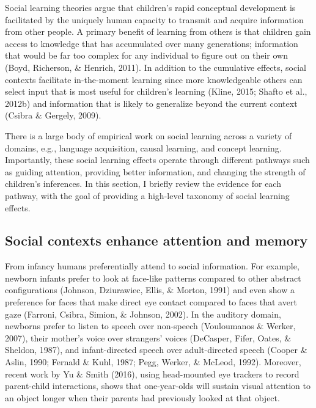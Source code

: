 \documentclass[oneside]{report}
\begin{document}
Social learning theories argue that children's rapid conceptual
development is facilitated by the uniquely human capacity to transmit
and acquire information from other people. A primary benefit of learning
from others is that children gain access to knowledge that has
accumulated over many generations; information that would be far too
complex for any individual to figure out on their own (Boyd, Richerson,
\& Henrich, 2011). In addition to the cumulative effects, social
contexts facilitate in-the-moment learning since more knowledgeable
others can select input that is most useful for children's learning
(Kline, 2015; Shafto et al., 2012b) and information that is likely to
generalize beyond the current context (Csibra \& Gergely, 2009).

There is a large body of empirical work on social learning across a
variety of domains, e.g., language acquisition, causal learning, and
concept learning. Importantly, these social learning effects operate
through different pathways such as guiding attention, providing better
information, and changing the strength of children's inferences. In this
section, I briefly review the evidence for each pathway, with the goal
of providing a high-level taxonomy of social learning effects.

\hypertarget{social-contexts-enhance-attention-and-memory}{%
\subsection{Social contexts enhance attention and
memory}\label{social-contexts-enhance-attention-and-memory}}

From infancy humans preferentially attend to social information. For
example, newborn infants prefer to look at face-like patterns compared
to other abstract configurations (Johnson, Dziurawiec, Ellis, \& Morton,
1991) and even show a preference for faces that make direct eye contact
compared to faces that avert gaze (Farroni, Csibra, Simion, \& Johnson,
2002). In the auditory domain, newborns prefer to listen to speech over
non-speech (Vouloumanos \& Werker, 2007), their mother's voice over
strangers' voices (DeCasper, Fifer, Oates, \& Sheldon, 1987), and
infant-directed speech over adult-directed speech (Cooper \& Aslin,
1990; Fernald \& Kuhl, 1987; Pegg, Werker, \& McLeod, 1992). Moreover,
recent work by Yu \& Smith (2016), using head-mounted eye trackers to
record parent-child interactions, shows that one-year-olds will sustain
visual attention to an object longer when their parents had previously
looked at that object.
\end{document}
